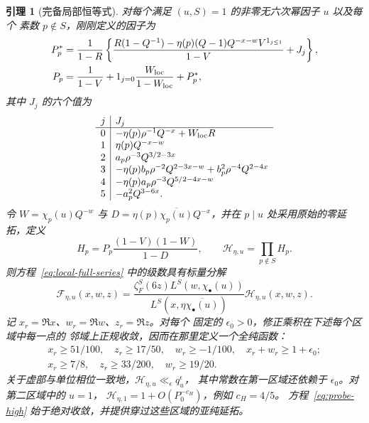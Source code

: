 \documentclass[11pt,a4paper]{article}
\numberwithin{equation}{section}
\numberwithin{figure}{section}
\newtheorem{lemma}[theorem]{引理}
\theoremstyle{definition}
\theoremstyle{remark}
\begin{document}
\begin{lemma}[完备局部恒等式]\label{lem:local-euler}
对每个满足 $(u,S)=1$ 的非零无六次幂因子 $u$ 以及每个
素数 $p\notin S$，刚刚定义的因子为
\begin{equation}\label{old-eq:5.13a}
\begin{aligned}
 P_p^*&=\frac1{1-R}\left\{
 \frac{R(1-Q^{-1})-\eta(p)(Q-1)
 Q^{-x-w}V^{1_{j\le1}}}{1-V}+J_j\right\},\\
 P_p&=\frac1{1-V}+1_{j=0}\frac{W_{\rm loc}}{1-W_{\rm loc}}+P_p^*,
\end{aligned}
\end{equation}
其中 $J_j$ 的六个值为
\[
\begin{array}{c|l}
 j&J_j\\\hline
 0&-\eta(p)\rho^{-1}Q^{-x}+W_{\rm loc}R\\
 1&\eta(p)Q^{-x-w}\\
 2&a_p\rho^{-3}Q^{3/2-3x}\\
 3&-\eta(p)b_p\rho^{-2}Q^{2-3x-w}
       +b_p^2\rho^{-4}Q^{2-4x}\\
 4&-\eta(p)a_p\rho^{-3}Q^{5/2-4x-w}\\
 5&-a_p^2Q^{3-6x}.
\end{array}
\]
令 $W=\chi_p(u)Q^{-w}$ 与
$D=\eta(p)\overline{\chi_p(u)}Q^{-x}$，并在 $p\mid u$
处采用原始的零延拓，定义
\begin{equation}\label{eq:local-H-definition}
 H_p=P_p\frac{(1-V)(1-W)}{1-D},\qquad
 \mathcal H_{\eta,u}=\prod_{p\notin S}H_p.
\end{equation}
则方程~\eqref{eq:local-full-series} 中的级数具有标量分解
\begin{equation}\label{eq:probe-high}
 \mathcal F_{\eta,u}(x,w,z)=
 \frac{\zeta_F^S(6z)L^S(w,\chi_\bullet(u))}
 {L^S(x,\eta\overline{\chi_\bullet(u)})}
 \mathcal H_{\eta,u}(x,w,z).
\end{equation}
记 $x_r=\Re x$、$w_r=\Re w$、$z_r=\Re z$。对每个
固定的 $\epsilon_0>0$，修正乘积在下述每个区域中每一点的
邻域上正规收敛，因而在那里定义一个全纯函数：
\begin{align}
 x_r\ge51/100,\quad z_r\ge17/50,\quad w_r\ge-1/100,\quad
 x_r+w_r\ge1+\epsilon_0;\label{eq:local-region-one}\\
 x_r\ge7/8,\quad z_r\ge33/200,\quad w_r\ge19/20.
 \label{eq:local-region-two}
\end{align}
关于虚部与单位相位一致地，$\mathcal H_{\eta,u}\ll_\epsilon q_u^\epsilon$，
其中常数在第一区域还依赖于 $\epsilon_0$。对第二区域中的 $u=1$，
$\mathcal H_{\eta,1}=1+O(P_0^{-c_H})$，例如 $c_H=4/5$。
方程~\eqref{eq:probe-high} 始于绝对收敛，并提供穿过这些区域的亚纯延拓。
\end{lemma}
\end{document}
